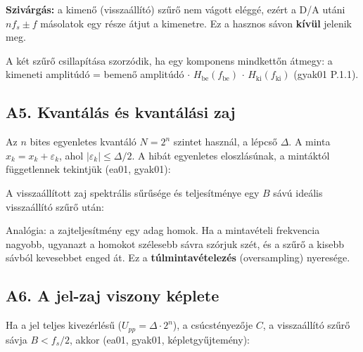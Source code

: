 \textbf{Szivárgás:} a kimenő (visszaállító) szűrő nem vágott eléggé, ezért a D/A utáni $n f_s\pm f$ másolatok egy része átjut a kimenetre. Ez a hasznos sávon \textbf{kívül} jelenik meg.

A két szűrő csillapítása szorzódik, ha egy komponens mindkettőn átmegy: a kimeneti amplitúdó = bemenő amplitúdó $\cdot$ $H_\text{be}(f_\text{be})$ $\cdot$ $H_\text{ki}(f_\text{ki})$ (gyak01 P.1.1).

\subsection{\texorpdfstring{A5. Kvantálás és kvantálási zaj}{A5. Kvantálás és kvantálási zaj}}\label{a2-kvantalas}
Az $n$ bites egyenletes kvantáló $N=2^n$ szintet használ, a lépcső $\Delta$. A minta $\hat x_k=x_k+\varepsilon_k$, ahol $|\varepsilon_k|\le\Delta/2$. A hibát egyenletes eloszlásúnak, a mintáktól függetlennek tekintjük (ea01, gyak01):

\begin{center}\end{center}

A visszaállított zaj spektrális sűrűsége és teljesítménye egy $B$ sávú ideális visszaállító szűrő után:

\begin{center}\end{center}

Analógia: a zajteljesítmény egy adag homok. Ha a mintavételi frekvencia nagyobb, ugyanazt a homokot szélesebb sávra szórjuk szét, és a szűrő a kisebb sávból kevesebbet enged át. Ez a \textbf{túlmintavételezés} (oversampling) nyeresége.

\subsection{\texorpdfstring{A6. A jel-zaj viszony képlete}{A6. A jel-zaj viszony képlete}}\label{a2-snr}
Ha a jel teljes kivezérlésű ($U_{pp}=\Delta\cdot 2^n$), a csúcstényezője $C$, a visszaállító szűrő sávja $B<f_s/2$, akkor (ea01, gyak01, képletgyűjtemény):

\begin{center}\end{center}

